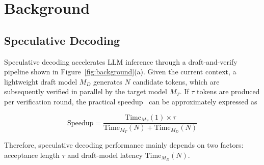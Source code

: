 

\section{Background}



\subsection{Speculative Decoding}
Speculative decoding accelerates LLM inference through a draft-and-verify pipeline shown in Figure~\ref{fig:background}(a). Given the current context, a lightweight draft model \(M_D\) generates \(N\) candidate tokens, which are subsequently verified in parallel by the target model \(M_T\). If \(\tau\) tokens are produced per verification round, the practical speedup~\cite{nvidiaspec} can be approximately expressed as

\begin{equation}
    \mathrm{Speedup} = \frac{\mathrm{Time}_{M_T}(1) \times \tau}{\mathrm{Time}_{M_T}(N)+\mathrm{Time}_{M_D}(N)}
\end{equation}

Therefore, speculative decoding performance mainly depends on two factors: acceptance length \(\tau\) and draft-model latency \(\mathrm{Time}_{M_D}(N)\).

